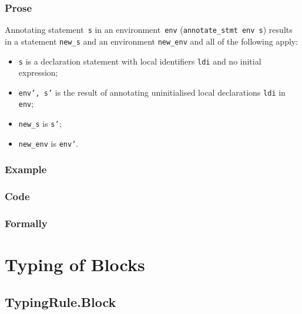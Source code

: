 \documentclass{book}
\begin{document}
  \subsection{Prose}
Annotating statement~\texttt{s} in an environment~\texttt{env}
(\texttt{annotate\_stmt env s}) results in a statement \texttt{new\_s} and an
environment \texttt{new\_env} and all of the following apply:
   \begin{itemize}
   \item \texttt{s} is a declaration statement with local identifiers \texttt{ldi} and no initial expression;
   \item \texttt{env', s'} is the result of annotating uninitialised local declarations \texttt{ldi} in \texttt{env};
   \item \texttt{new\_s} is \texttt{s'};
   \item \texttt{new\_env} is \texttt{env'}.
   \end{itemize}

  \subsection{Example}

  \subsection{Code}

\begin{emptyformal}
    \subsection{Formally}
\end{emptyformal}


\chapter{Typing of Blocks}

\section{TypingRule.Block \label{sec:TypingRule.Block}}
\end{document}
